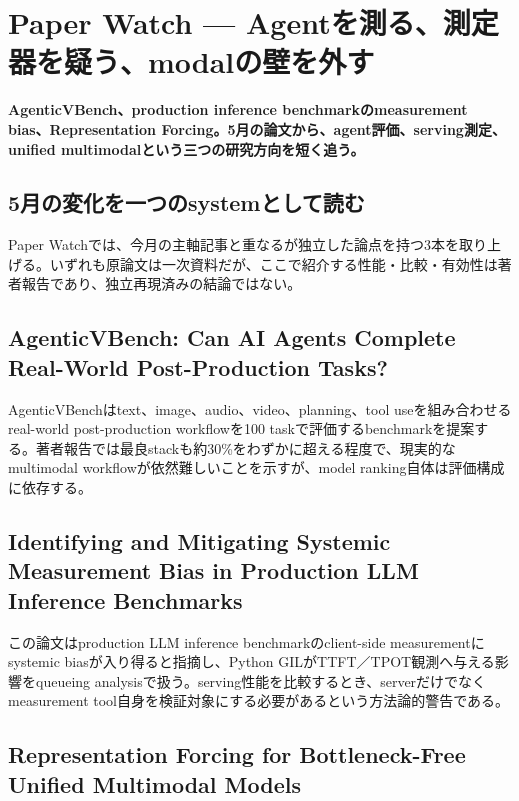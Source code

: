 \section{Paper Watch — Agentを測る、測定器を疑う、modalの壁を外す}
\label{pkg:paper-watch-may}
\noindent\textbf{AgenticVBench、production inference benchmarkのmeasurement bias、Representation Forcing。5月の論文から、agent評価、serving測定、unified multimodalという三つの研究方向を短く追う。}\autocite{src-24add4f36a45,src-99d7ea892e92,src-ea2dcbeedd27}

\subsection{5月の変化を一つのsystemとして読む}

Paper Watchでは、今月の主軸記事と重なるが独立した論点を持つ3本を取り上げる。いずれも原論文は一次資料だが、ここで紹介する性能・比較・有効性は著者報告であり、独立再現済みの結論ではない。\autocite{src-24add4f36a45,src-99d7ea892e92,src-ea2dcbeedd27}


\subsection{AgenticVBench: Can AI Agents Complete Real-World Post-Production Tasks?}

AgenticVBenchはtext、image、audio、video、planning、tool useを組み合わせるreal-world post-production workflowを100 taskで評価するbenchmarkを提案する。著者報告では最良stackも約30\%をわずかに超える程度で、現実的なmultimodal workflowが依然難しいことを示すが、model ranking自体は評価構成に依存する。\autocite{src-ea2dcbeedd27}


\subsection{Identifying and Mitigating Systemic Measurement Bias in Production LLM Inference Benchmarks}

この論文はproduction LLM inference benchmarkのclient-side measurementにsystemic biasが入り得ると指摘し、Python GILがTTFT／TPOT観測へ与える影響をqueueing analysisで扱う。serving性能を比較するとき、serverだけでなくmeasurement tool自身を検証対象にする必要があるという方法論的警告である。\autocite{src-24add4f36a45}


\subsection{Representation Forcing for Bottleneck-Free Unified Multimodal Models}

